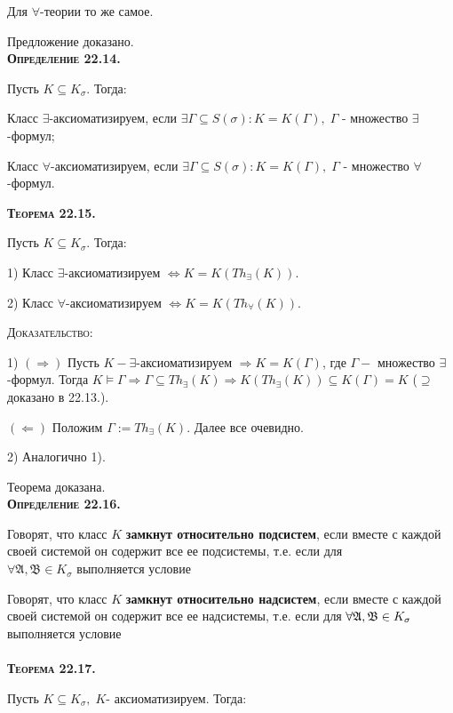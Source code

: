 \documentclass[18pt, a4paper]{extarticle}
\newcommand{\opred}[1]{\textbf{\textsc{Определение #1}}}
\newcommand{\teor}[1]{\textbf{\textsc{Теорема #1}}}
\newcommand{\Gm}{\Gamma}
\newcommand{\vD}{\vDash}
\newcommand{\sg}{\sigma}
\newcommand{\centr}[1]{\makebox[\linewidth]{#1}}
\newcommand{\rightdok}{\boxed{(\Rightarrow)}}
\newcommand{\leftdok}{\boxed{(\Leftarrow)}}
\newcommand{\mA}{\mathfrak{A}}
\newcommand{\mB}{\mathfrak{B}}
\newcommand{\dok}{\textsc{Доказательство:}}
\begin{document}
Для $\forall$-теории то же самое.

Предложение доказано.\\

\opred {22.14.} 

Пусть $K\subseteq K_\sg$. Тогда:

Класс $\exists$-аксиоматизируем, если $\exists\Gm\subseteq S(\sg)\!\!: K=K(\Gm),\;\Gm$ - множество $\exists$-формул;

Класс $\forall$-аксиоматизируем, если $\exists\Gm\subseteq S(\sg)\!\!: K=K(\Gm),\;\Gm$ - множество $\forall$-формул.

\teor {22.15.} 

Пусть $K\subseteq K_\sg$. Тогда:

1) Класс $\exists$-аксиоматизируем $\Leftrightarrow K=K(Th_\exists(K))$.

2) Класс $\forall$-аксиоматизируем $\Leftrightarrow K=K(Th_\forall(K))$.

\dok

1) $\rightdok$ Пусть $K-\exists$-аксиоматизируем $\Rightarrow K=K(\Gm)$, где $\Gm-$ множество $\exists$-формул. Тогда $K\vD\Gm\Rightarrow\Gm\subseteq Th_\exists(K)\Rightarrow K(Th_\exists(K))\subseteq K(\Gm)=K$
\newline ($\supseteq$ доказано в 22.13.).

$\leftdok$ Положим $\Gm:=Th_\exists(K)$. Далее все очевидно.

2) Аналогично 1).

Теорема доказана.\\

\opred {22.16.} 

Говорят, что класс $K$ \textbf{замкнут относительно подсистем}, если вместе с каждой своей системой он содержит все ее подсистемы, т.е. если для\\$\forall\mA,\mB\in K_\sg$ выполняется условие 
\\\centr{$\mA\in K$ и $\mB\subseteq\mA\Rightarrow\mB\in K$. }

Говорят, что класс $K$ \textbf{замкнут относительно надсистем}, если вместе с каждой своей системой он содержит все ее надсистемы, т.е. если для 
$\newline\forall\mA,\mB\in K_\sg$ выполняется условие
\\\centr{$\mA\in K$ и $\mA\subseteq\mB\Rightarrow\mB\in K$.}\\

\teor {22.17.} 

Пусть $K\subseteq K_\sg,\;K$- аксиоматизируем. Тогда:
\end{document}
